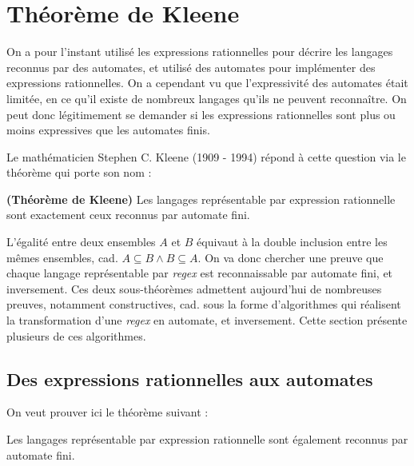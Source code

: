 \chapter{Théorème de Kleene}
\label{hierarchie}

On a pour l'instant utilisé les expressions rationnelles pour décrire les langages reconnus par des automates, et utilisé des automates pour implémenter des expressions rationnelles. On a cependant vu que l'expressivité des automates était limitée, en ce qu'il existe de nombreux langages qu'ils ne peuvent reconnaître. On peut donc légitimement se demander si les expressions rationnelles sont plus ou moins expressives que les automates finis.

Le mathématicien Stephen C. Kleene (1909 - 1994) répond à cette question via le théorème qui porte son nom :

\begin{theorem}{\textbf{(Théorème de Kleene)}}
Les langages représentable par expression rationnelle sont exactement ceux reconnus par automate fini.
\end{theorem}

L'égalité entre deux ensembles $A$ et $B$ équivaut à la double inclusion entre les mêmes ensembles, cad. $A \subseteq B \wedge B \subseteq A$. On va donc chercher une preuve que chaque langage représentable par \textit{regex} est reconnaissable par automate fini, et inversement. Ces deux sous-théorèmes admettent aujourd'hui de nombreuses preuves, notamment constructives, cad. sous la forme d'algorithmes qui réalisent la transformation d'une \textit{regex} en automate, et inversement. Cette section présente plusieurs de ces algorithmes.

\section{Des expressions rationnelles aux automates}

On veut prouver ici le théorème suivant :

\begin{theorem}
Les langages représentable par expression rationnelle sont également reconnus par automate fini.
\end{theorem}

